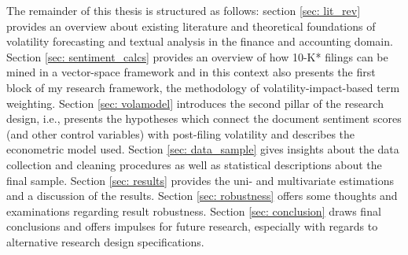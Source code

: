 The remainder of this thesis is structured as follows: section \ref{sec: lit_rev} provides an overview about existing literature and theoretical foundations of volatility forecasting and textual analysis in the finance and accounting domain. Section \ref{sec: sentiment_calcs} provides an overview of how 10-K* filings can be mined in a vector-space framework and in this context also presents the first block of my research framework, the methodology of volatility-impact-based term weighting. Section \ref{sec: volamodel} introduces the second pillar of the research design, i.e., presents the hypotheses which connect the document sentiment scores (and other control variables) with post-filing volatility and describes the econometric model used. Section \ref{sec: data_sample} gives insights about the data collection and cleaning procedures as well as statistical descriptions about the final sample. Section \ref{sec: results} provides the uni- and multivariate estimations and a discussion of the results. Section \ref{sec: robustness} offers some thoughts and examinations regarding result robustness. Section \ref{sec: conclusion} draws final conclusions and offers impulses for future research, especially with regards to alternative research design specifications.
\clearpage